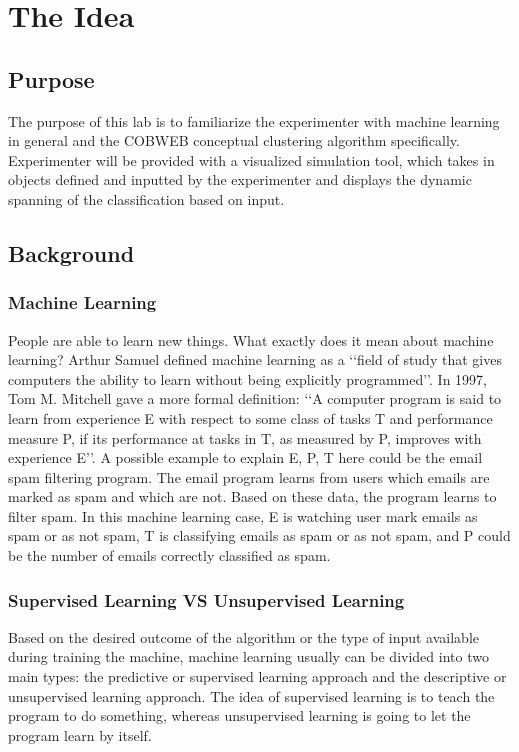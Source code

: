 %
%
%
\section{The Idea}
\subsection{Purpose}
The purpose of this lab is to familiarize the experimenter with machine learning in general and the COBWEB conceptual clustering algorithm specifically. Experimenter will be provided with a visualized simulation tool, which takes in objects defined and inputted by the experimenter and displays the dynamic spanning of the classification based on input.

\subsection{Background}

\subsubsection {Machine Learning}
People are able to learn new things. What exactly does it mean about machine learning?  Arthur Samuel defined machine learning as a \lq\lq{field of study that gives computers the ability to learn without being explicitly programmed}\rq\rq\cite{simon2013too}. In 1997, Tom M. Mitchell gave a more formal definition: \lq\lq{A computer program is said to learn from experience E with respect to some class of tasks T and performance measure P, if its performance at tasks in T, as measured by P, improves with experience E}\rq\rq\cite{mitchell1997machine}. A possible example to explain E, P, T here could be the email spam filtering program. The email program learns from users which emails are marked as spam and which are not. Based on these data, the program learns to filter spam. In this machine learning case, E is watching user mark emails as spam or as not spam, T is classifying emails as spam or as not spam, and P could be the number of emails correctly classified as spam\cite{stanford}.

\subsubsection {Supervised Learning VS Unsupervised Learning}
Based on the desired outcome of the algorithm or the type of input available during training the machine, machine learning usually can be divided into two main types: the predictive or supervised learning approach and the descriptive or unsupervised learning approach\cite{murphy2012machine}. The idea of supervised learning is to teach the program to do something, whereas unsupervised learning is going to let the program learn by itself. 

